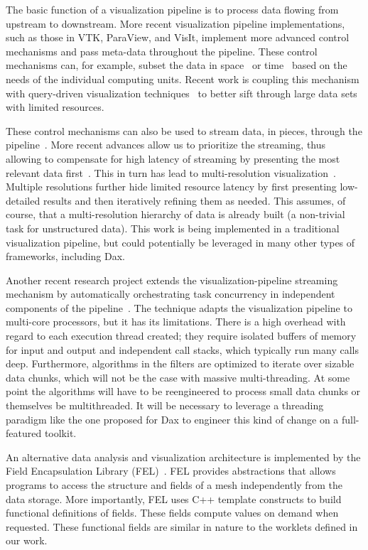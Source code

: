 \documentclass{vgtc}                          %
\newcommand*{\lcite}[1]{~\cite{#1}}
\begin{document}
The basic function of a visualization pipeline is to process data flowing
from upstream to downstream.  More recent visualization pipeline
implementations, such as those in VTK, ParaView, and VisIt, implement more
advanced control mechanisms and pass meta-data throughout the pipeline.
These control mechanisms can, for example, subset the data in
space\lcite{Childs05} or time\lcite{Biddiscombe07} based on the needs of
the individual computing units.  Recent work is coupling this mechanism
with query-driven visualization techniques\lcite{Gosink08} to better sift
through large data sets with limited resources.

These control mechanisms can also be used to stream data, in pieces,
through the pipeline\lcite{Ahrens01}.  More recent advances allow us to
prioritize the streaming, thus allowing to compensate for high latency of
streaming by presenting the most relevant data first\lcite{Ahrens07}.  This
in turn has lead to multi-resolution
visualization\lcite{Pascucci01,Woodring09}.  Multiple resolutions further
hide limited resource latency by first presenting low-detailed results and
then iteratively refining them as needed.  This assumes, of course, that a
multi-resolution hierarchy of data is already built (a non-trivial task for
unstructured data).  This work is being implemented in a traditional
visualization pipeline, but could potentially be leveraged in many other
types of frameworks, including Dax.

Another recent research project extends the visualization-pipeline
streaming mechanism by automatically orchestrating task concurrency in
independent components of the pipeline\lcite{Vo09}.  The technique adapts
the visualization pipeline to multi-core processors, but it has its
limitations.  There is a high overhead with regard to each execution thread
created; they require isolated buffers of memory for input and output and
independent call stacks, which typically run many calls deep.  Furthermore,
algorithms in the filters are optimized to iterate over sizable data
chunks, which will not be the case with massive multi-threading.  At some
point the algorithms will have to be reengineered to process small data
chunks or themselves be multithreaded.  It will be necessary to leverage a
threading paradigm like the one proposed for Dax to engineer this kind of
change on a full-featured toolkit.

An alternative data analysis and visualization architecture is implemented
by the Field Encapsulation Library (FEL)\lcite{FELPaper}.  FEL provides
abstractions that allows programs to access the structure and fields of a
mesh independently from the data storage.  More importantly, FEL uses C++
template constructs to build functional definitions of fields.  These
fields compute values on demand when requested.  These functional fields
are similar in nature to the worklets defined in our work.
\end{document}
